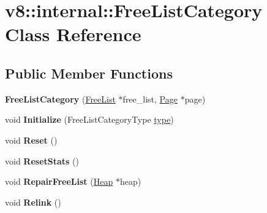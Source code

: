\hypertarget{classv8_1_1internal_1_1FreeListCategory}{}\section{v8\+:\+:internal\+:\+:Free\+List\+Category Class Reference}
\label{classv8_1_1internal_1_1FreeListCategory}
\subsection*{Public Member Functions}
\begin{DoxyCompactItemize}
\item 
\mbox{\label{classv8_1_1internal_1_1FreeListCategory_a67f651b50064e79ab1f5c4b3873438ec}} 
{\bfseries Free\+List\+Category} (\mbox{\hyperlink{classv8_1_1internal_1_1FreeList}{Free\+List}} $\ast$free\+\_\+list, \mbox{\hyperlink{classv8_1_1internal_1_1Page}{Page}} $\ast$page)
\item 
\mbox{\label{classv8_1_1internal_1_1FreeListCategory_a5f433934357036f7199d55a8410987da}} 
void {\bfseries Initialize} (Free\+List\+Category\+Type \mbox{\hyperlink{classstd_1_1conditional_1_1type}{type}})
\item 
\mbox{\label{classv8_1_1internal_1_1FreeListCategory_ad990a3fde12ff8ad7de041d86290e30a}} 
void {\bfseries Reset} ()
\item 
\mbox{\label{classv8_1_1internal_1_1FreeListCategory_a2950a535ed7dc57b181531a387f88737}} 
void {\bfseries Reset\+Stats} ()
\item 
\mbox{\label{classv8_1_1internal_1_1FreeListCategory_a5c4612d807dcf03546d802ad081beb2a}} 
void {\bfseries Repair\+Free\+List} (\mbox{\hyperlink{classv8_1_1internal_1_1Heap}{Heap}} $\ast$heap)
\item 
\mbox{\label{classv8_1_1internal_1_1FreeListCategory_a1fcddd498785db7739ad713d351b88e3}} 
void {\bfseries Relink} ()
\item 
\mbox{\label{classv8_1_1internal_1_1FreeListCategory_a548b810cbe726b4769d39b97a1375f64}} 

\end{DoxyCompactItemize}
